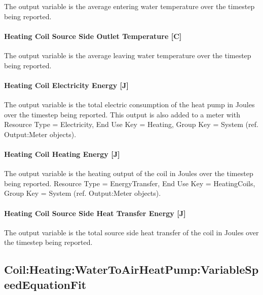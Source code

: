 The output variable is the average entering water temperature over the timestep being reported.

\paragraph{Heating Coil Source Side Outlet Temperature {[}C{]}}\label{heating-coil-source-side-outlet-temperature-c}

The output variable is the average leaving water temperature over the timestep being reported.

\paragraph{Heating Coil Electricity Energy {[}J{]}}\label{heating-coil-electric-energy-j-5}

The output variable is the total electric consumption of the heat pump in Joules over the timestep being reported. This output is also added to a meter with Resource Type = Electricity, End Use Key = Heating, Group Key = System (ref. Output:Meter objects).

\paragraph{Heating Coil Heating Energy {[}J{]}}\label{heating-coil-heating-energy-j-10}

The output variable is the heating output of the coil in Joules over the timestep being reported. Resource Type = EnergyTransfer, End Use Key = HeatingCoils, Group Key = System (ref. Output:Meter objects).

\paragraph{Heating Coil Source Side Heat Transfer Energy {[}J{]}}\label{heating-coil-source-side-heat-transfer-energy-j-2}

The output variable is the total source side heat transfer of the coil in Joules over the timestep being reported.

\subsection{Coil:Heating:WaterToAirHeatPump:VariableSpeedEquationFit}\label{coilheatingwatertoairheatpumpvariablespeedequationfit}

